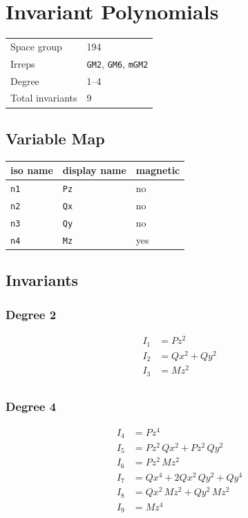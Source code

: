 \documentclass{article}
\begin{document}
\section*{Invariant Polynomials}

\begin{tabular}{ll}
\toprule
Space group & 194 \\
Irreps & \texttt{GM2\textminus{}}, \texttt{GM6\textminus{}}, \texttt{mGM2\textplus{}} \\
Degree & 1--4 \\
Total invariants & 9 \\
\bottomrule
\end{tabular}

\subsection*{Variable Map}

\begin{tabular}{lll}
\toprule
iso name & display name & magnetic \\
\midrule
\texttt{n1} & \texttt{Pz} & no \\
\texttt{n2} & \texttt{Qx} & no \\
\texttt{n3} & \texttt{Qy} & no \\
\texttt{n4} & \texttt{Mz} & yes \\
\bottomrule
\end{tabular}

\subsection*{Invariants}

\subsubsection*{Degree 2}

\begin{align*}
I_{1} &= Pz^{2} \\
I_{2} &= Qx^{2} + Qy^{2} \\
I_{3} &= Mz^{2} \\
\end{align*}

\subsubsection*{Degree 4}

\begin{align*}
I_{4} &= Pz^{4} \\
I_{5} &= Pz^{2}\,Qx^{2} + Pz^{2}\,Qy^{2} \\
I_{6} &= Pz^{2}\,Mz^{2} \\
I_{7} &= Qx^{4} + 2Qx^{2}\,Qy^{2} + Qy^{4} \\
I_{8} &= Qx^{2}\,Mz^{2} + Qy^{2}\,Mz^{2} \\
I_{9} &= Mz^{4} \\
\end{align*}
\end{document}
